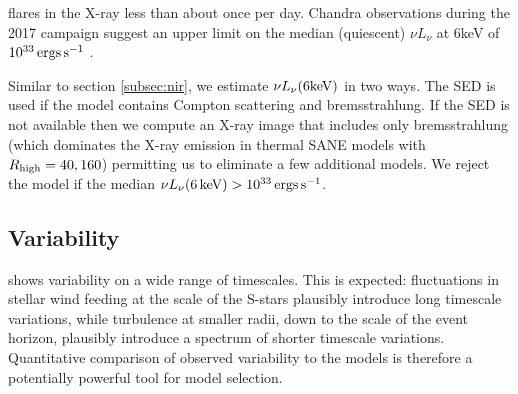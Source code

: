 \sgra flares in the X-ray less than about once per day.  Chandra observations during the 2017 campaign suggest an upper limit on the median (quiescent) $\nu L_\nu$ at $6$keV of $10^{33}\,\mathrm{ergs\,s^{-1}}$ \citep{PaperIII}.

Similar to section \ref{subsec:nir}, we estimate $\nu L_\nu (6 {\rm keV})$ in two ways.  The SED is used if the model contains Compton scattering and bremsstrahlung.  If the SED is not available then we compute an X-ray image that includes only bremsstrahlung (which dominates the X-ray emission in thermal SANE models with $R_\mathrm{high} = 40, 160$) permitting us to eliminate a few additional models.  We reject the model if the median $\nu L_\nu(6\,\mathrm{keV}) > 10^{33}\,\mathrm{ergs\,s^{-1}}$.

\subsection{Variability}

%


\sgra shows variability on a wide range of timescales.  This is expected: fluctuations in stellar wind feeding at the scale of the S-stars plausibly introduce long timescale variations, while turbulence at smaller radii, down to the scale of the event horizon, plausibly introduce a spectrum of shorter timescale variations.  Quantitative comparison of observed variability to the models is therefore a potentially powerful tool for model selection.

